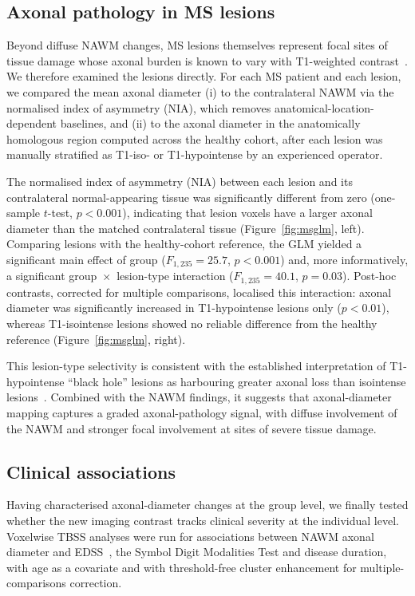 \documentclass[11pt]{article}
\begin{document}
\subsection{Axonal pathology in MS lesions}

Beyond diffuse NAWM changes, MS lesions themselves represent focal sites of tissue damage whose axonal burden is known to vary with T1-weighted contrast~\cite{vanwaesberghe1999axonal}. We therefore examined the lesions directly. For each MS patient and each lesion, we compared the mean axonal diameter (i) to the contralateral NAWM via the normalised index of asymmetry (NIA), which removes anatomical-location-dependent baselines, and (ii) to the axonal diameter in the anatomically homologous region computed across the healthy cohort, after each lesion was manually stratified as T1-iso- or T1-hypointense by an experienced operator.

The normalised index of asymmetry (NIA) between each lesion and its contralateral normal-appearing tissue was significantly different from zero (one-sample $t$-test, $p<0.001$), indicating that lesion voxels have a larger axonal diameter than the matched contralateral tissue (Figure~\ref{fig:msglm}, left). Comparing lesions with the healthy-cohort reference, the GLM yielded a significant main effect of group ($F_{1,235}=25.7$, $p<0.001$) and, more informatively, a significant group~$\times$~lesion-type interaction ($F_{1,235}=40.1$, $p=0.03$). Post-hoc contrasts, corrected for multiple comparisons, localised this interaction: axonal diameter was significantly increased in T1-hypointense lesions only ($p<0.01$), whereas T1-isointense lesions showed no reliable difference from the healthy reference (Figure~\ref{fig:msglm}, right).

This lesion-type selectivity is consistent with the established interpretation of T1-hypointense ``black hole'' lesions as harbouring greater axonal loss than isointense lesions~\cite{vanwaesberghe1999axonal,raz2015relationship}. Combined with the NAWM findings, it suggests that axonal-diameter mapping captures a graded axonal-pathology signal, with diffuse involvement of the NAWM and stronger focal involvement at sites of severe tissue damage.

\subsection{Clinical associations}

Having characterised axonal-diameter changes at the group level, we finally tested whether the new imaging contrast tracks clinical severity at the individual level. Voxelwise TBSS analyses were run for associations between NAWM axonal diameter and EDSS~\cite{kurtzke1983rating}, the Symbol Digit Modalities Test and disease duration, with age as a covariate and with threshold-free cluster enhancement for multiple-comparisons correction.
\end{document}
